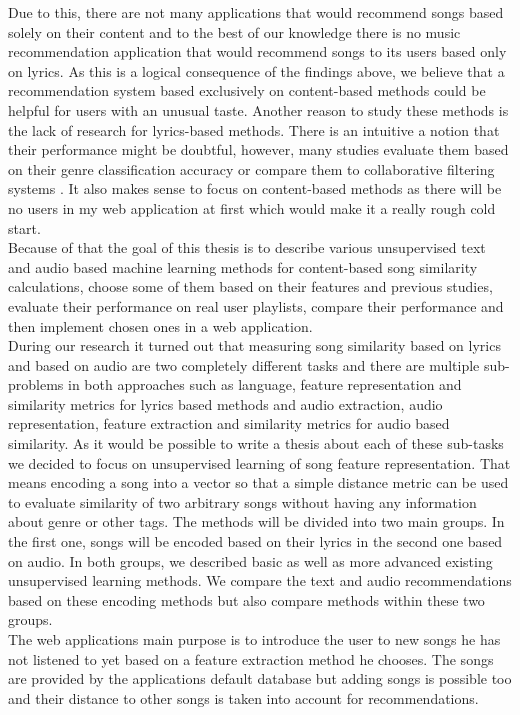 Due to this, there are not many applications that would recommend songs based solely on their content and to the best of our knowledge there is no music recommendation application that would recommend songs to its users based only on lyrics. As this is a logical consequence of the findings above, we believe that a recommendation system based exclusively on content-based methods could be helpful for users with an unusual taste. Another reason to study these methods is the lack of research for lyrics-based methods. There is an intuitive a notion that their performance might be doubtful, however, many studies evaluate them based on their genre classification accuracy \cite{DBLP:journals/corr/Tsaptsinos17} or compare them to collaborative filtering systems \cite{Gossi2016LyricBasedMR}. It also makes sense to focus on content-based methods as there will be no users in my web application at first which would make it a really rough cold start. \\
Because of that the goal of this thesis is to describe various unsupervised text and audio based machine learning methods for content-based song similarity calculations, choose some of them based on their features and previous studies, evaluate their performance on real user playlists, compare their performance and then implement chosen ones in a web application.\\
During our research it turned out that measuring song similarity based on lyrics and based on audio are two completely different tasks and there are multiple sub-problems in both approaches such as language, feature representation and similarity metrics for lyrics based methods and audio extraction, audio representation, feature extraction and similarity metrics for audio based similarity. As it would be possible to write a thesis about each of these sub-tasks we decided to focus on unsupervised learning of song feature representation. That means encoding a song into a vector so that a simple distance metric can be used to evaluate similarity of two arbitrary songs without having any information about genre or other tags. The methods will be divided into two main groups. In the first one, songs will be encoded based on their lyrics in the second one based on audio. In both groups, we described basic as well as more advanced existing unsupervised learning methods. We compare the text and audio recommendations based on these encoding methods but also compare methods within these two groups. \\
The web applications main purpose is to introduce the user to new songs he has not listened to yet based on a feature extraction method he chooses. The songs are provided by the applications default database but adding songs is possible too and their distance to other songs is taken into account for recommendations. \\


